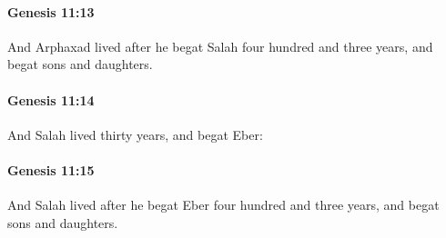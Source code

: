 		\paragraph{Genesis 11:13} %
			\label{GENESIS-11-13}

			And Arphaxad lived after he begat Salah four hundred and three years, and begat sons and daughters.


		\paragraph{Genesis 11:14} %
			\label{GENESIS-11-14}

			And Salah lived thirty years, and begat Eber:


		\paragraph{Genesis 11:15} %
			\label{GENESIS-11-15}

			And Salah lived after he begat Eber four hundred and three years, and begat sons and daughters.


